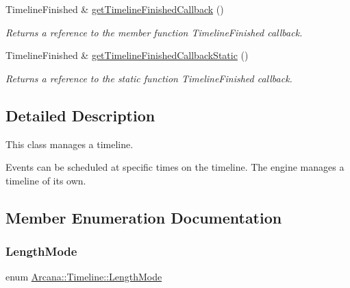 \begin{DoxyCompactItemize}
\mbox{\label{class_arcana_1_1_timeline_a5a973e73ab5f8c4feb69faf1c39047ba}} 
Timeline\+Finished \& \mbox{\hyperlink{class_arcana_1_1_timeline_a5a973e73ab5f8c4feb69faf1c39047ba}{get\+Timeline\+Finished\+Callback}} ()
\begin{DoxyCompactList}\small\item\em Returns a reference to the member function Timeline\+Finished callback. \end{DoxyCompactList}\item 
\mbox{\label{class_arcana_1_1_timeline_a05bea86db2489aa9e31d42bd85bb042e}} 
Timeline\+Finished \& \mbox{\hyperlink{class_arcana_1_1_timeline_a05bea86db2489aa9e31d42bd85bb042e}{get\+Timeline\+Finished\+Callback\+Static}} ()
\begin{DoxyCompactList}\small\item\em Returns a reference to the static function Timeline\+Finished callback. \end{DoxyCompactList}\end{DoxyCompactItemize}


\subsection{Detailed Description}
This class manages a timeline. 

Events can be scheduled at specific times on the timeline. The engine manages a timeline of its own. 

\subsection{Member Enumeration Documentation}
\mbox{\label{class_arcana_1_1_timeline_ab4605d34e12005cf268ca146751f1eed}} 
\subsubsection{\texorpdfstring{Length\+Mode}{LengthMode}}
{\footnotesize\ttfamily enum \mbox{\hyperlink{class_arcana_1_1_timeline_ab4605d34e12005cf268ca146751f1eed}{Arcana\+::\+Timeline\+::\+Length\+Mode}}}



